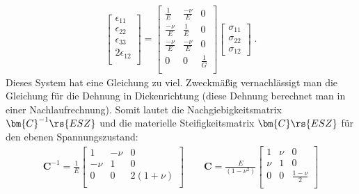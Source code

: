 \documentclass[letterpaper,10pt,german]{jupyterBook}
\begin{document}
\begin{equation}\label{equation:chapters/chapter1/elasticity:generalHookESZ2}
\begin{split}\begin{bmatrix} 
\epsilon_{11} \\
\epsilon_{22} \\
\epsilon_{33} \\
2\epsilon_{12} \\
\end{bmatrix} = \begin{bmatrix}
\frac{1}{E} & \frac{-\nu}{E}  & 0  \\
\frac{-\nu}{E} & \frac{1}{E}  & 0  \\
{\frac{-\nu}{E}} & {\frac{-\nu}{E}} & {0} \\
0 & 0 & \frac{1}{G}  \\
\end{bmatrix} \begin{bmatrix} \sigma_{11} \\ \sigma_{22} \\ \sigma_{12} \end{bmatrix} \; .\end{split}
\end{equation}
\sphinxAtStartPar
Dieses System hat eine Gleichung zu viel. Zweckmäßig vernachlässigt man die Gleichung für die Dehnung in Dickenrichtung (diese Dehnung berechnet man in einer Nachlaufrechnung). Somit lautet die Nachgiebigkeitsmatrix \(\bm{C}^{-1}\rs{ESZ}\) und die materielle Steifigkeitsmatrix \(\bm{C}\rs{ESZ}\) für den ebenen Spannungszustand:
\begin{equation}\label{equation:chapters/chapter1/elasticity:generalHookESZ3}
\begin{split}\bm{C}^{-1} = \frac{1}{E} \begin{bmatrix}
1 & -\nu & 0  \\
-\nu & 1  & 0  \\
0 & 0 & 2(1+\nu)  \\
\end{bmatrix}  \qquad 
\bm{C} = \frac{E}{(1-\nu^2)}\begin{bmatrix}
1 & \nu  & 0  \\
\nu & 1  & 0  \\
0 & 0 & \frac{1-\nu}{2}  \\
\end{bmatrix}\end{split}
\end{equation}
\end{document}
